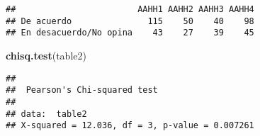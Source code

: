 \documentclass[
]{article}
\newenvironment{Shaded}{\begin{snugshade}}{\end{snugshade}}
\newcommand{\KeywordTok}[1]{\textcolor[rgb]{0.13,0.29,0.53}{\textbf{#1}}}
\newcommand{\NormalTok}[1]{#1}
\begin{document}
\begin{verbatim}
##                        AAHH1 AAHH2 AAHH3 AAHH4
## De acuerdo               115    50    40    98
## En desacuerdo/No opina    43    27    39    45
\end{verbatim}

\begin{Shaded}
\begin{Highlighting}[]
\KeywordTok{chisq.test}\NormalTok{(table2)}
\end{Highlighting}
\end{Shaded}

\begin{verbatim}
## 
##  Pearson's Chi-squared test
## 
## data:  table2
## X-squared = 12.036, df = 3, p-value = 0.007261
\end{verbatim}
\end{document}
